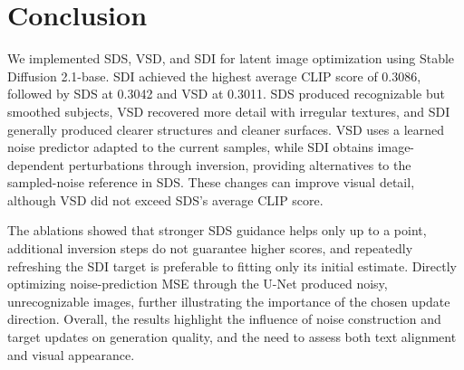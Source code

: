 \section{Conclusion}
\label{sec:conclusion}

We implemented SDS, VSD, and SDI for latent image optimization using Stable Diffusion 2.1-base.
SDI achieved the highest average CLIP score of 0.3086, followed by SDS at 0.3042 and VSD at 0.3011.
SDS produced recognizable but smoothed subjects, VSD recovered more detail with irregular textures,
and SDI generally produced clearer structures and cleaner surfaces.
VSD uses a learned noise predictor adapted to the current samples, while SDI obtains image-dependent
perturbations through inversion, providing alternatives to the sampled-noise reference in SDS.
These changes can improve visual detail, although VSD did not exceed SDS's average CLIP score.

The ablations showed that stronger SDS guidance helps only up to a point, additional inversion steps
do not guarantee higher scores, and repeatedly refreshing the SDI target is preferable to fitting
only its initial estimate.
Directly optimizing noise-prediction MSE through the U-Net produced noisy, unrecognizable images,
further illustrating the importance of the chosen update direction.
Overall, the results highlight the influence of noise construction and target updates on generation
quality, and the need to assess both text alignment and visual appearance.
